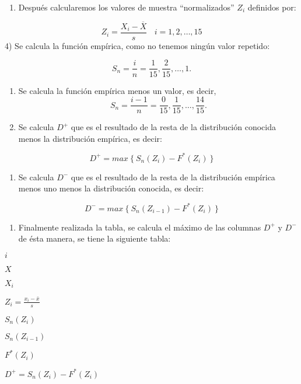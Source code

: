 \documentclass[
  a4paper,
  oneside,
  openany]{book}
\providecommand{\tightlist}{%
  \setlength{\itemsep}{0pt}\setlength{\parskip}{0pt}}
\begin{document}
\begin{enumerate}
\def\labelenumi{\arabic{enumi})}
\setcounter{enumi}{2}
\tightlist
\item
  Después calcularemos los valores de muestra ``normalizados'' \(Z_{i}\) definidos por:
\end{enumerate}

\[Z_{i}=\frac{X_{i}-\overline{X}}{s} \ \ \ \ i=1,2,\ldots,15\]
4) Se calcula la función empírica, como no tenemos ningún valor repetido:

\[S_{n}= \frac{i}{n}=\frac{1}{15},\frac{2}{15}, \ldots, 1. \]

\begin{enumerate}
\def\labelenumi{\arabic{enumi})}
\setcounter{enumi}{4}
\item
  Se calcula la función empírica menos un valor, es decir,
  \[S_{n}= \frac{i-1}{n}=\frac{0}{15},\frac{1}{15}, \ldots, \frac{14}{15}.\]
\item
  Se calcula \(D^+\) que es el resultado de la resta de la distribución conocida menos la distribución empírica, es decir:
\end{enumerate}

\[D^+= max\ \{ \ S_{n}(Z_{i})-F^*(Z_{i}) \ \}\]

\begin{enumerate}
\def\labelenumi{\arabic{enumi})}
\setcounter{enumi}{6}
\tightlist
\item
  Se calcula \(D^-\) que es el resultado de la resta de la distribución empírica menos uno menos la distribución conocida, es decir:
\end{enumerate}

\[D^-= max\ \{\ S_{n}(Z_{i-1})-F^*(Z_{i}) \ \}\]

\begin{enumerate}
\def\labelenumi{\arabic{enumi})}
\setcounter{enumi}{7}
\tightlist
\item
  Finalmente realizada la tabla, se calcula el máximo de las columnas \(D^+\) y \(D^-\) de ésta manera, se tiene la siguiente tabla:
\end{enumerate}

\(i\)

\(X\)

\(X_i\)

\(Z_i=\frac{x_i-\bar{x}}{s}\)

\(S_n(Z_i)\)

\(S_n(Z_{i-1})\)

\(F^*(Z_i)\)

\(D^+=S_n(Z_i)-F^*(Z_i)\)
\end{document}
